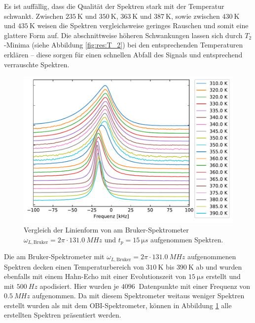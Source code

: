 Es ist auffällig, dass die Qualität der Spektren stark mit der Temperatur schwankt. Zwischen $\SI{235}{\kelvin}$ und $\SI{350}{\kelvin}$, $\SI{363}{\kelvin}$ und $\SI{387}{\kelvin}$, sowie zwischen $\SI{430}{\kelvin}$ und $\SI{435}{\kelvin}$ weisen die Spektren vergleichsweise geringes Rauschen und somit eine glattere Form auf. Die abschnittweise höheren Schwankungen lassen sich durch $T_2$-Minima (siehe Abbildung \ref{fig:res:T_2}) bei den entsprechenden Temperaturen erklären -- diese sorgen für einen schnellen Abfall des Signals und entsprechend verrauschte Spektren.

\begin{figure}
	\begin{center}
		\includegraphics[width=\textwidth]{graphics/plot/bruker_lineshape.pdf}
	\end{center}
	\caption{Vergleich der Linienform von am Bruker-Spektrometer $\omega_{L, \text{Bruker}} = 2\pi \cdot \SI{131.0}{MHz}$ und $t_p = \SI{15}{\micro s}$ aufgenommen Spektren.} \label{fig:res:bruker_linienform}
\end{figure}
Die am Bruker-Spektrometer mit $\omega_{L, \text{Bruker}} = 2\pi \cdot \SI{131.0}{MHz}$ aufgenommenen Spektren decken einen Temperaturbereich von $\SI{310}{\kelvin}$ bis $\SI{390}{\kelvin}$ ab und wurden ebenfalls mit einem Hahn-Echo mit einer Evolutionszeit von $\SI{15}{\micro s}$ erstellt und mit $\SI{500}{Hz}$ apodisiert. Hier wurden je $\SI{4096}{}$ Datenpunkte mit einer Frequenz von $\SI{0.5}{MHz}$ aufgenommen. Da mit diesem Spektrometer weitaus weniger Spektren erstellt wurden als mit dem OBI-Spektrometer, können in Abbildung \ref{fig:res:bruker_linienform} alle erstellten Spektren präsentiert werden.

